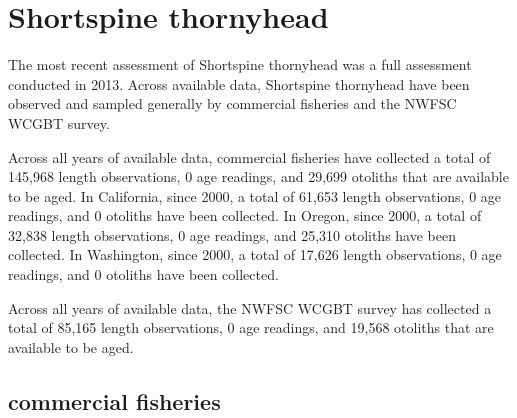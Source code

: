 \documentclass[11pt,
  english,
  letterpaper,
]{article}
\begin{document}

\hypertarget{shortspine-thornyhead}{%
\section{Shortspine thornyhead}\label{shortspine-thornyhead}}

\leavevmode\tagmcend\tagstructend


The most recent assessment of Shortspine thornyhead was a full assessment conducted in 2013. Across available data, Shortspine thornyhead have been observed and sampled generally by commercial fisheries and the NWFSC WCGBT survey.

\leavevmode\tagmcend\tagstructend\par


Across all years of available data, commercial fisheries have collected a total of 145,968 length observations, 0 age readings, and 29,699 otoliths that are available to be aged. In California, since 2000, a total of 61,653 length observations, 0 age readings, and 0 otoliths have been collected. In Oregon, since 2000, a total of 32,838 length observations, 0 age readings, and 25,310 otoliths have been collected. In Washington, since 2000, a total of 17,626 length observations, 0 age readings, and 0 otoliths have been collected.

\leavevmode\tagmcend\tagstructend\par


Across all years of available data, the NWFSC WCGBT survey has collected a total of 85,165 length observations, 0 age readings, and 19,568 otoliths that are available to be aged.

\leavevmode\tagmcend\tagstructend\par


\hypertarget{commercial-fisheries-48}{%
\subsection{commercial fisheries}\label{commercial-fisheries-48}}

\leavevmode\tagmcend\tagstructend

\end{document}

